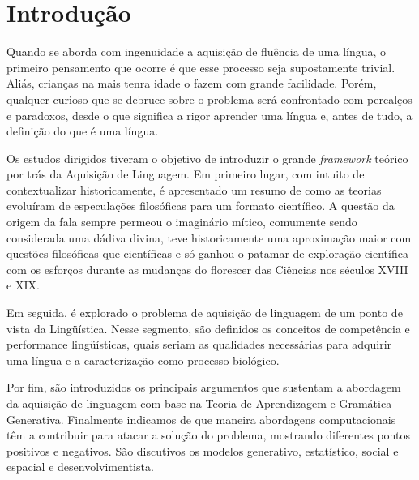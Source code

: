 \section*{Introdução}
\noindent
Quando se aborda com ingenuidade a aquisição de fluência de uma língua, o primeiro pensamento que ocorre é que esse processo seja supostamente trivial. Aliás, crianças na mais tenra idade o fazem com grande facilidade. Porém, qualquer curioso que se debruce sobre o problema será confrontado com percalços e paradoxos, desde o que significa a rigor aprender uma língua e, antes de tudo, a definição do que é uma língua.

Os estudos dirigidos tiveram o objetivo de introduzir o grande \emph{framework} teórico por trás da Aquisição de Linguagem. Em primeiro lugar, com intuito de contextualizar historicamente, é apresentado um resumo de como as teorias evoluíram de especulações filosóficas para um formato científico. A questão da origem da fala sempre permeou o imaginário mítico, comumente sendo considerada uma dádiva divina, teve historicamente uma aproximação maior com questões filosóficas que científicas e só ganhou o patamar de exploração científica com os esforços durante as mudanças do florescer das Ciências nos séculos XVIII e XIX.

Em seguida, é explorado o problema de aquisição de linguagem de um ponto de vista da Lingüística. Nesse segmento, são definidos os conceitos de competência e performance lingüísticas, quais seriam as qualidades necessárias para adquirir uma língua e a caracterização como processo biológico.

Por fim, são introduzidos os principais argumentos que sustentam a abordagem da aquisição de linguagem com base na Teoria de Aprendizagem e Gramática Generativa. Finalmente indicamos de que maneira abordagens computacionais têm a contribuir para atacar a solução do problema, mostrando diferentes pontos positivos e negativos. São discutivos os modelos generativo, estatístico, social e espacial e desenvolvimentista.